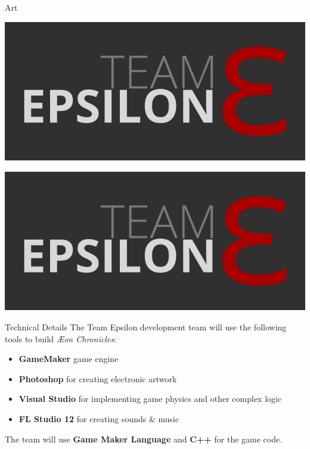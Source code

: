 \documentclass{teamepsilon}
\begin{document}
\begin{frame}{Art}

\begin{minipage}{0.65\textwidth}
\includegraphics[width=\textwidth]{../logo/team-epsilon.png}
\end{minipage}%

\begin{minipage}{0.35\textwidth}
\includegraphics[width=\textwidth]{../logo/team-epsilon.png}
\end{minipage}

\end{frame}

\begin{frame}{Technical Details}
    The Team Epsilon development team will use the following tools to build
    \textit{{\AE}on Chronicles}:

    \begin{itemize}
        \item \textbf{GameMaker} game engine
        \item \textbf{Photoshop} for creating electronic artwork
        \item \textbf{Visual Studio} for implementing game physics and other
            complex logic
        \item \textbf{FL Studio 12} for creating sounds \& music
    \end{itemize}

    The team will use \textbf{Game Maker Language} and \textbf{C++} for the game
    code.
\end{frame}
\end{document}
